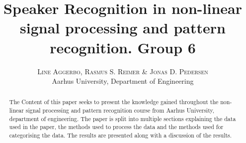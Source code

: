 

\title{
	\vspace{-15mm}
	\fontsize{24pt}{10pt}
	\selectfont
	\textbf{Speaker Recognition in non-linear signal processing and pattern recognition.
	 \vspace{5mm} \Large Group 6}
}

\author{
	\large
	\textsc{Line Aggerbo, Rasmus S. Reimer \& Jonas D. Pedersen}\\[2mm]
	\normalsize Aarhus University, Department of Engineering \\
	\vspace{-5mm}
}
\date{}




\maketitle
\thispagestyle{fancy} %
\raggedright



\begin{abstract}
The Content of this paper seeks to present the knowledge gained throughout the non-linear signal processing and pattern recognition course from Aarhus University, department of engineering. The paper is split into multiple sections explaining the data used in the paper, the methods used to process the data and the methods used for categorising the data. The results are presented along with a discussion of the results. 
\end{abstract}






\begingroup
	\raggedright
	
\endgroup


